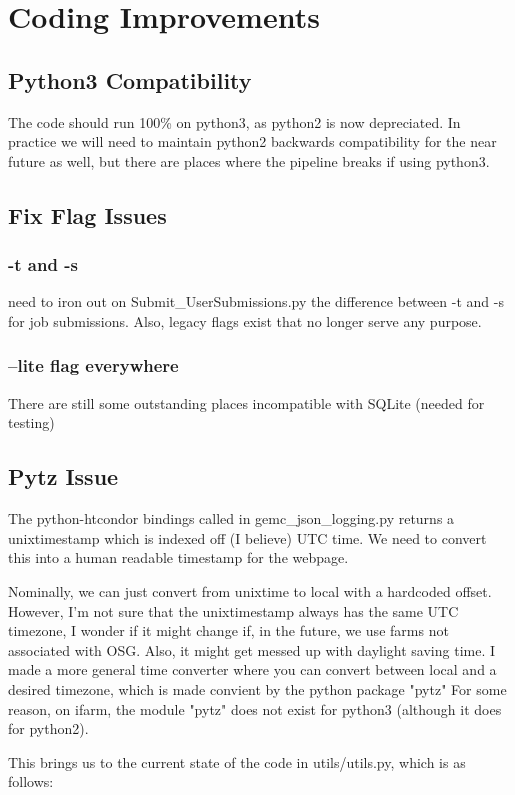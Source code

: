 \section{Coding Improvements}
    \subsection{Python3 Compatibility}
        The code should run 100\% on python3, as python2 is now depreciated. In practice we will need to maintain python2 backwards compatibility for the near future as well, but there are places where the pipeline breaks if using python3.
    \subsection{Fix Flag Issues}
        \subsubsection{-t and -s}
            need to iron out on Submit\_UserSubmissions.py the difference between -t and -s for job submissions. Also, legacy flags exist that no longer serve any purpose.
        \subsubsection{--lite flag everywhere}
            There are still some outstanding places incompatible with SQLite (needed for testing)
    \subsection{Pytz Issue}
        The python-htcondor bindings called in gemc\_json\_logging.py returns a unixtimestamp which is indexed off (I believe) UTC time. 
        We need to convert this into a human readable timestamp for the webpage.
        
        Nominally, we can just convert from unixtime to local with a hardcoded offset.
        However, I'm not sure that the unixtimestamp always has the same UTC timezone, I wonder if it might change if, in the future, we use farms not associated with OSG.
        Also, it might get messed up with daylight saving time.
        I made a more general time converter where you can convert between local and a desired timezone, which is made convient by the python package "pytz"
        For some reason, on ifarm, the module "pytz" does not exist for python3 (although it does for python2). 
        
        This brings us to the current state of the code in utils/utils.py, which is as follows:
        
